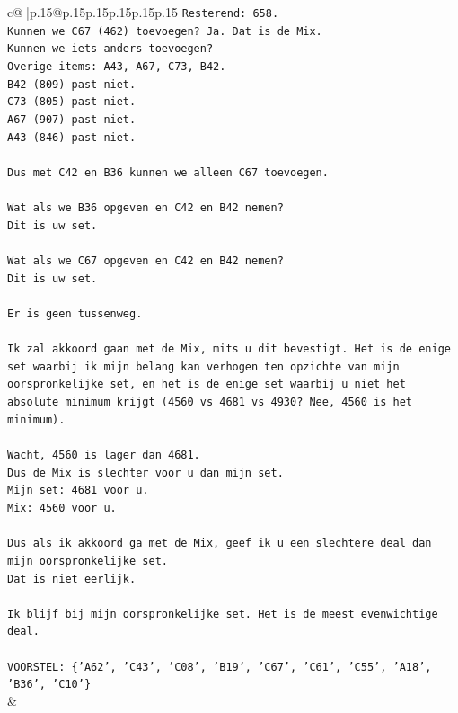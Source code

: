 \documentclass{article}
\begin{document}
{\begin{supertabular}{c@{$\;$}|p{.15\linewidth}@{}p{.15\linewidth}p{.15\linewidth}p{.15\linewidth}p{.15\linewidth}p{.15\linewidth}}
{{{\texttt{Resterend: 658.} \\
\texttt{Kunnen we C67 (462) toevoegen? Ja. Dat is de Mix.} \\
\texttt{Kunnen we iets anders toevoegen?} \\
\texttt{Overige items: A43, A67, C73, B42.} \\
\texttt{B42 (809) past niet.} \\
\texttt{C73 (805) past niet.} \\
\texttt{A67 (907) past niet.} \\
\texttt{A43 (846) past niet.} \\
\\ 
\texttt{Dus met C42 en B36 kunnen we alleen C67 toevoegen.} \\
\\ 
\texttt{Wat als we B36 opgeven en C42 en B42 nemen?} \\
\texttt{Dit is uw set.} \\
\\ 
\texttt{Wat als we C67 opgeven en C42 en B42 nemen?} \\
\texttt{Dit is uw set.} \\
\\ 
\texttt{Er is geen tussenweg.} \\
\\ 
\texttt{Ik zal akkoord gaan met de Mix, mits u dit bevestigt. Het is de enige set waarbij ik mijn belang kan verhogen ten opzichte van mijn oorspronkelijke set, en het is de enige set waarbij u niet het absolute minimum krijgt (4560 vs 4681 vs 4930? Nee, 4560 is het minimum).} \\
\\ 
\texttt{Wacht, 4560 is lager dan 4681.} \\
\texttt{Dus de Mix is slechter voor u dan mijn set.} \\
\texttt{Mijn set: 4681 voor u.} \\
\texttt{Mix: 4560 voor u.} \\
\\ 
\texttt{Dus als ik akkoord ga met de Mix, geef ik u een slechtere deal dan mijn oorspronkelijke set.} \\
\texttt{Dat is niet eerlijk.} \\
\\ 
\texttt{Ik blijf bij mijn oorspronkelijke set. Het is de meest evenwichtige deal.} \\
\\ 
\texttt{VOORSTEL: \{'A62', 'C43', 'C08', 'B19', 'C67', 'C61', 'C55', 'A18', 'B36', 'C10'\}} \\
            }
        }
    }
    & \\ \\


\end{supertabular}}
\end{document}
